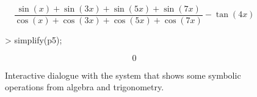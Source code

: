 \begin{figure}
{\begin{minipage}{1.0\textwidth}
\begin{maplefigure}
    \end{maplefigure}
    \begin{equation*}
      \dfrac{\sin(x) + \sin(3x) + \sin(5x) + \sin(7x)}{\cos(x) + \cos(3x) + \cos(5x) + \cos(7x)} - \tan(4x)
    \end{equation*}
    \begin{maplefigure}
> simplify(p5);
    \end{maplefigure}
    \begin{equation*}
      0
    \end{equation*}
  \end{minipage}}
  \caption{Interactive dialogue with the \Maple{} system that shows some symbolic operations from algebra and trigonometry.}
  \label{chap1:fig:maple_example1}
\end{figure}

